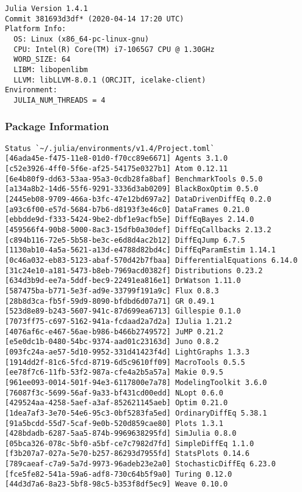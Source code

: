 \documentclass[12pt,a4paper]{article}
\begin{document}
\begin{verbatim}
Julia Version 1.4.1
Commit 381693d3df* (2020-04-14 17:20 UTC)
Platform Info:
  OS: Linux (x86_64-pc-linux-gnu)
  CPU: Intel(R) Core(TM) i7-1065G7 CPU @ 1.30GHz
  WORD_SIZE: 64
  LIBM: libopenlibm
  LLVM: libLLVM-8.0.1 (ORCJIT, icelake-client)
Environment:
  JULIA_NUM_THREADS = 4

\end{verbatim}

\subsubsection{Package Information}

\begin{verbatim}
Status `~/.julia/environments/v1.4/Project.toml`
[46ada45e-f475-11e8-01d0-f70cc89e6671] Agents 3.1.0
[c52e3926-4ff0-5f6e-af25-54175e0327b1] Atom 0.12.11
[6e4b80f9-dd63-53aa-95a3-0cdb28fa8baf] BenchmarkTools 0.5.0
[a134a8b2-14d6-55f6-9291-3336d3ab0209] BlackBoxOptim 0.5.0
[2445eb08-9709-466a-b3fc-47e12bd697a2] DataDrivenDiffEq 0.2.0
[a93c6f00-e57d-5684-b7b6-d8193f3e46c0] DataFrames 0.21.0
[ebbdde9d-f333-5424-9be2-dbf1e9acfb5e] DiffEqBayes 2.14.0
[459566f4-90b8-5000-8ac3-15dfb0a30def] DiffEqCallbacks 2.13.2
[c894b116-72e5-5b58-be3c-e6d8d4ac2b12] DiffEqJump 6.7.5
[1130ab10-4a5a-5621-a13d-e4788d82bd4c] DiffEqParamEstim 1.14.1
[0c46a032-eb83-5123-abaf-570d42b7fbaa] DifferentialEquations 6.14.0
[31c24e10-a181-5473-b8eb-7969acd0382f] Distributions 0.23.2
[634d3b9d-ee7a-5ddf-bec9-22491ea816e1] DrWatson 1.11.0
[587475ba-b771-5e3f-ad9e-33799f191a9c] Flux 0.8.3
[28b8d3ca-fb5f-59d9-8090-bfdbd6d07a71] GR 0.49.1
[523d8e89-b243-5607-941c-87d699ea6713] Gillespie 0.1.0
[7073ff75-c697-5162-941a-fcdaad2a7d2a] IJulia 1.21.2
[4076af6c-e467-56ae-b986-b466b2749572] JuMP 0.21.2
[e5e0dc1b-0480-54bc-9374-aad01c23163d] Juno 0.8.2
[093fc24a-ae57-5d10-9952-331d41423f4d] LightGraphs 1.3.3
[1914dd2f-81c6-5fcd-8719-6d5c9610ff09] MacroTools 0.5.5
[ee78f7c6-11fb-53f2-987a-cfe4a2b5a57a] Makie 0.9.5
[961ee093-0014-501f-94e3-6117800e7a78] ModelingToolkit 3.6.0
[76087f3c-5699-56af-9a33-bf431cd00edd] NLopt 0.6.0
[429524aa-4258-5aef-a3af-852621145aeb] Optim 0.21.0
[1dea7af3-3e70-54e6-95c3-0bf5283fa5ed] OrdinaryDiffEq 5.38.1
[91a5bcdd-55d7-5caf-9e0b-520d859cae80] Plots 1.3.1
[428bdadb-6287-5aa5-874b-9969638295fd] SimJulia 0.8.0
[05bca326-078c-5bf0-a5bf-ce7c7982d7fd] SimpleDiffEq 1.1.0
[f3b207a7-027a-5e70-b257-86293d7955fd] StatsPlots 0.14.6
[789caeaf-c7a9-5a7d-9973-96adeb23e2a0] StochasticDiffEq 6.23.0
[fce5fe82-541a-59a6-adf8-730c64b5f9a0] Turing 0.12.0
[44d3d7a6-8a23-5bf8-98c5-b353f8df5ec9] Weave 0.10.0
\end{verbatim}
\end{document}
